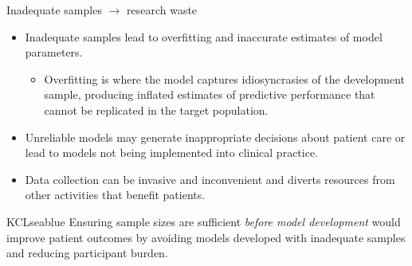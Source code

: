 \documentclass[11pt]{beamer}
\begin{document}
\begin{frame}[t]{Inadequate samples $\rightarrow$ research waste}

    \begin{itemize}
        \item Inadequate samples lead to overfitting and inaccurate estimates
            of model parameters.
            \begin{itemize}
                \item Overfitting is where the model captures idiosyncrasies of the
                    development sample, producing inflated estimates of predictive performance
                    that cannot be replicated in the target population.
            \end{itemize}
        \item Unreliable models may generate inappropriate decisions about
            patient care or lead to models not being implemented into clinical
            practice.
        \item Data collection can be invasive and inconvenient and diverts
            resources from other activities that benefit patients.

    \end{itemize}

    \begin{cbox}{KCLseablue}{}
        Ensuring sample sizes are sufficient \emph{before model development}
        would improve patient outcomes by avoiding models developed with
        inadequate samples and reducing participant burden.
\end{cbox}
\end{frame}
\end{document}
